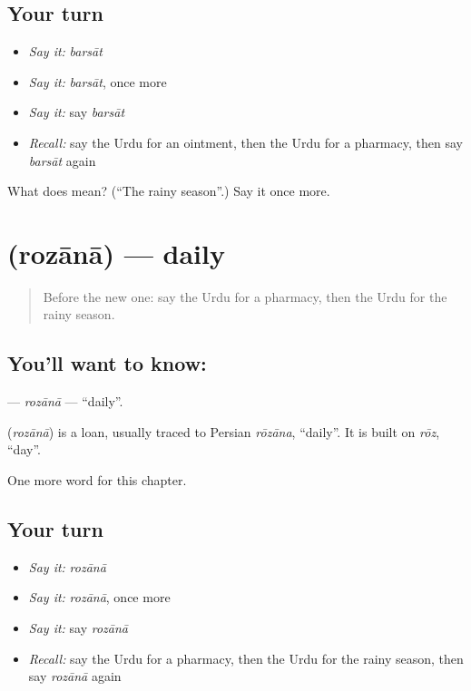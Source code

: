 \subsection*{Your turn}
\begin{itemize}
\raggedright
  \item \emph{Say it:} \emph{barsāt}
  \item \emph{Say it:} \emph{barsāt}, once more
  \item \emph{Say it:} say \emph{barsāt}
  \item \emph{Recall:} say the Urdu for an ointment, then the Urdu for a pharmacy, then say \emph{barsāt} again
\end{itemize}

\begin{tcolorbox}[breakable,colback=teal!4,colframe=teal!35!black,title={Before you move on}]
What does  mean? (\textquotedblleft{}The rainy season\textquotedblright{}.) Say it once more.
\end{tcolorbox}
\section[\texorpdfstring{\ur{روزانہ} (rozānā)}{روزانہ (rozānā)}]{ (rozānā) — daily}

\label{lesson:UR-C245-rozana}



\begin{quote}
Before the new one: say the Urdu for a pharmacy, then the Urdu for the rainy season.
\end{quote}

\subsection*{You'll want to know: }
\textbf{} — \emph{rozānā} — \textquotedblleft{}daily\textquotedblright{}.

\begin{cousinweb}
\textbf{} (\emph{rozānā}) is a loan, usually traced to Persian \emph{rōzāna}, \textquotedblleft{}daily\textquotedblright{}. It is built on \emph{rōz}, \textquotedblleft{}day\textquotedblright{}.
\end{cousinweb}

\begin{grammarlens}[title={What you've built}]
One more word for this chapter.
\end{grammarlens}

\subsection*{Your turn}
\begin{itemize}
\raggedright
  \item \emph{Say it:} \emph{rozānā}
  \item \emph{Say it:} \emph{rozānā}, once more
  \item \emph{Say it:} say \emph{rozānā}
  \item \emph{Recall:} say the Urdu for a pharmacy, then the Urdu for the rainy season, then say \emph{rozānā} again
\end{itemize}

